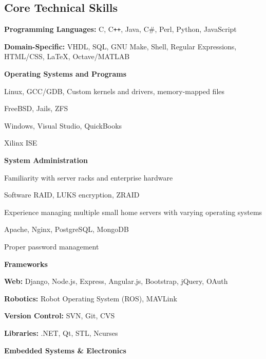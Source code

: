 \documentclass[10pt,letterpaper]{article}
\begin{document}
\subsection*{Core Technical Skills}
\begin{itemize*}
    \item \textbf{Programming Languages:} C, C\texttt{++}, Java, C\#, Perl,
            Python, JavaScript
    \item \textbf{Domain-Specific:} VHDL, SQL, GNU Make, Shell, Regular
            Expressions, HTML/CSS, \LaTeX, Octave/MATLAB
    \item \textbf{Operating Systems and Programs}
        \begin{itemize*}
            \item Linux, GCC/GDB, Custom kernels and drivers, memory-mapped files
            \item FreeBSD, Jails, ZFS
            \item Windows, Visual Studio, QuickBooks
            \item Xilinx ISE
        \end{itemize*}
    \item \textbf{System Administration}
        \begin{itemize*}
            \item Familiarity with server racks and enterprise hardware
            \item Software RAID, LUKS encryption, ZRAID
            \item Experience managing multiple small home servers with varying
                operating systems
            \item Apache, Nginx, PostgreSQL, MongoDB
            \item Proper password management
        \end{itemize*}
    \item \textbf{Frameworks}
        \begin{itemize*}
            \item \textbf{Web:} Django, Node.js, Express, Angular.js, Bootstrap,
                    jQuery, OAuth
            \item \textbf{Robotics:} Robot Operating System (ROS), MAVLink
            \item \textbf{Version Control:} SVN, Git, CVS
            \item \textbf{Libraries:} .NET, Qt, STL, Ncurses
        \end{itemize*}
    \item \textbf{Embedded Systems \& Electronics}

\end{itemize*}
\end{document}
